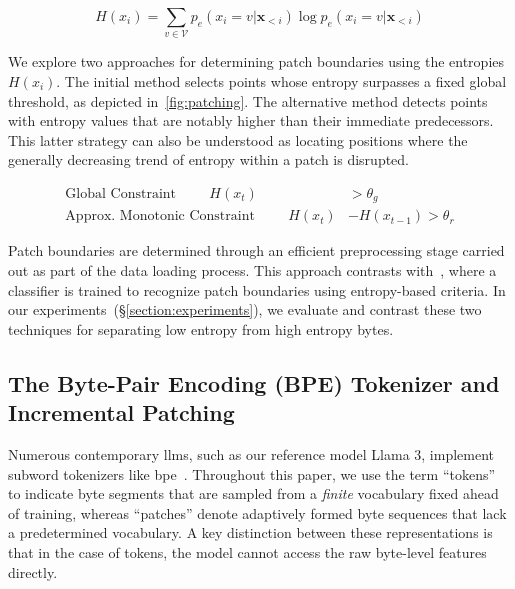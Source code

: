 \begin{equation}
H(x_i) = \sum_{v \in \mathcal{V}} p_{e}(x_i=v|\pmb{x}_{<i}) \log p_{e}(x_i=v|\pmb{x}_{<i})
\end{equation}

We explore two approaches for determining patch boundaries using the entropies $H(x_i)$. The initial method selects points whose entropy surpasses a fixed global threshold, as depicted in~\autoref{fig:patching}. The alternative method detects points with entropy values that are notably higher than their immediate predecessors. This latter strategy can also be understood as locating positions where the generally decreasing trend of entropy within a patch is disrupted.

\begin{align*}
    \text{Global Constraint}\hspace{1cm}H(x_t)& > \theta_g\\
    \text{Approx. Monotonic Constraint}\hspace{1cm}H(x_t)& - H(x_{t-1}) > \theta_r
\end{align*}

Patch boundaries are determined through an efficient preprocessing stage carried out as part of the data loading process. This approach contrasts with~\citet{nawrot-etal-2023-efficient}, where a classifier is trained to recognize patch boundaries using entropy-based criteria. In our experiments~(\S\ref{section:experiments}), we evaluate and contrast these two techniques for separating low entropy from high entropy bytes.

\subsection{The Byte-Pair Encoding (BPE) Tokenizer and Incremental Patching}
\label{section:incremental-patching}
\label{section:bpe-patch}

Numerous contemporary llms, such as our reference model Llama 3, implement subword tokenizers like bpe~\citep{gage1994new, sennrich-etal-2016-neural}. Throughout this paper, we use the term ``tokens'' to indicate byte segments that are sampled from a \textit{finite} vocabulary fixed ahead of training, whereas ``patches'' denote adaptively formed byte sequences that lack a predetermined vocabulary. A key distinction between these representations is that in the case of tokens, the model cannot access the raw byte-level features directly.


